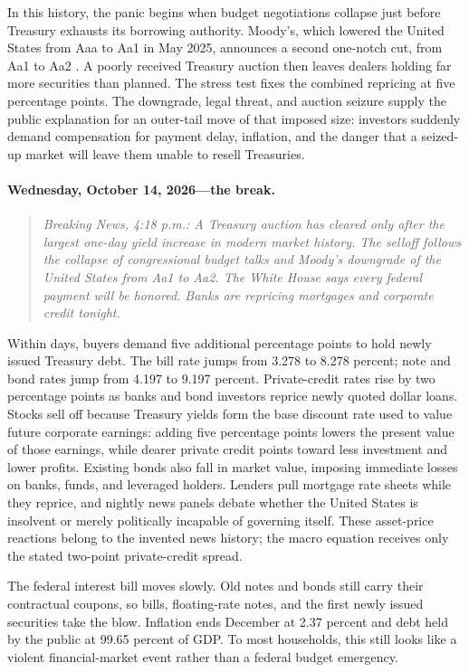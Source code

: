 \documentclass[11pt]{article}
\begin{document}
In this history, the panic begins when budget negotiations collapse just before Treasury
exhausts its borrowing authority.  Moody's, which lowered the United States from Aaa to Aa1
in May 2025, announces a second one-notch cut, from Aa1 to Aa2 \cite{moodysUS}.  A poorly
received Treasury auction then leaves dealers holding far more securities than planned.
The stress test fixes the combined repricing at five percentage points.  The downgrade, legal
threat, and auction seizure supply the public explanation for an outer-tail move of that
imposed size: investors suddenly demand compensation for payment delay, inflation, and the
danger that a seized-up market will leave them unable to resell Treasuries.

\paragraph{Wednesday, October 14, 2026---the break.}

\begin{quote}
\small\itshape
Breaking News, 4:18 p.m.: A Treasury auction has cleared only after the largest one-day
yield increase in modern market history.  The selloff follows the collapse of congressional
budget talks and Moody's downgrade of the United States from Aa1 to Aa2.  The White House
says every federal payment will be honored.  Banks are repricing mortgages and corporate
credit tonight.
\end{quote}

Within days, buyers demand five additional percentage points to hold newly issued Treasury
debt.  The bill rate jumps from 3.278 to 8.278 percent; note and bond rates jump from 4.197 to
9.197 percent.  Private-credit rates rise by two percentage points as banks and bond investors
reprice newly quoted dollar loans.  Stocks sell off because Treasury yields form the base
discount rate used to value future corporate earnings: adding five percentage points lowers
the present value of those earnings, while dearer private credit points toward less
investment and lower profits.  Existing bonds also fall in market value, imposing immediate
losses on banks, funds, and leveraged holders.  Lenders pull mortgage rate sheets while they
reprice, and nightly news panels debate whether the United States is insolvent or merely
politically incapable of governing itself.  These asset-price reactions belong to the
invented news history; the macro equation receives only the stated two-point private-credit
spread.

The federal interest bill moves slowly.  Old notes and bonds still carry their contractual
coupons, so bills, floating-rate notes, and the first newly issued securities take the blow.
Inflation ends December at 2.37 percent and debt held by the public at 99.65 percent of GDP.
To most households, this still looks like a violent financial-market event rather than a
federal budget emergency.
\end{document}
